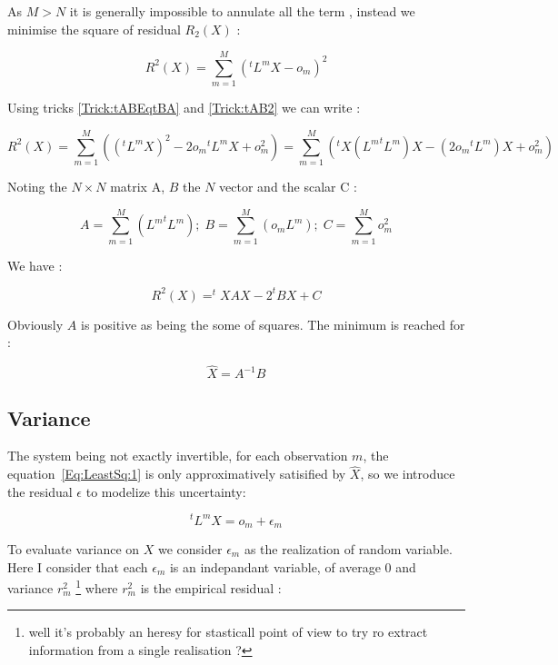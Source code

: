 As $M>N$ it is generally impossible to annulate all the term , instead we minimise the square of residual $R_2(X)$  :

\begin{equation}
    R^2(X) = \sum\limits_{m=1}^M ( ^tL^m   X - o_m) ^2  
\end{equation}

Using tricks \ref{Trick:tABEqtBA} and \ref{Trick:tAB2} we can write :

\begin{equation}
    R^2(X) = \sum\limits_{m=1}^M  ( (^tL^m   X)^2 - 2 o_m {^tL^m} X + o_m ^ 2) 
           = \sum\limits_{m=1}^M  ( {^t X ({L^m} ^t{L^m}) X} - (2 o_m {^tL^m} )X + o_m ^2)
\end{equation}


Noting the $N \times N$ matrix A, $B$ the $N$ vector and the scalar C :

\begin{equation}
           A = \sum\limits_{m=1}^M { ({L^m} ^t{L^m}) } 
       ;\; B = \sum\limits_{m=1}^M  ( o_m {L^m} ) 
       ;\; C = \sum\limits_{m=1}^M  o_m ^2
 \label{LeastSq:ABC}
\end{equation}

We have :

\begin{equation}
    R^2(X) = ^t X A X - 2^t B X + C
\end{equation}

Obviously $A$ is positive as being the some of squares. The minimum is reached for :

\begin{equation}
     \hat{X}  =  A^{-1} B
\end{equation}


\subsection{Variance}
\label{Sec:VarLsq}

The system being not exactly invertible, for each observation $m$,  
the equation~\ref{Eq:LeastSq:1} is only approximatively satisified by $\hat{X}$,
so we introduce the  residual $\epsilon$  to modelize this uncertainty:

\begin{equation}
     ^tL^m X = o_m + {\epsilon}_m
\end{equation}

To evaluate variance on $X$ we consider  ${\epsilon}_m$  as the realization of random variable. Here I consider that 
each ${\epsilon}_m$ is an indepandant variable, of average $0$ and variance $r_m^2$ \footnote{well  it's probably an heresy
for stasticall point of view to try ro extract information from a single realisation ?} where $r_m^2$ is the empirical residual :


